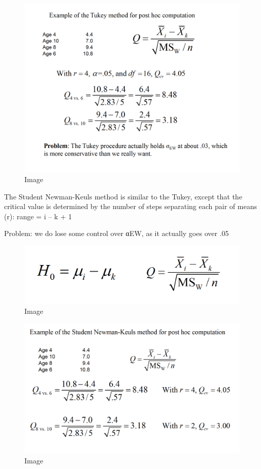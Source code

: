 \documentclass[]{book}
\theoremstyle{definition}
\theoremstyle{definition}
\theoremstyle{definition}
\theoremstyle{remark}
\begin{document}
\begin{figure}
\centering
\includegraphics{img/hicksphc4.png}
\caption{Image}
\end{figure}

The Student Newman-Keuls method is similar to the Tukey, except that the
critical value is determined by the number of steps separating each pair
of means (r): range = i -- k + 1

Problem: we do lose some control over αEW, as it actually goes over .05

\begin{figure}
\centering
\includegraphics{img/hicksphc5.png}
\caption{Image}
\end{figure}

\begin{figure}
\centering
\includegraphics{img/hicksphc6.png}
\caption{Image}
\end{figure}
\end{document}
